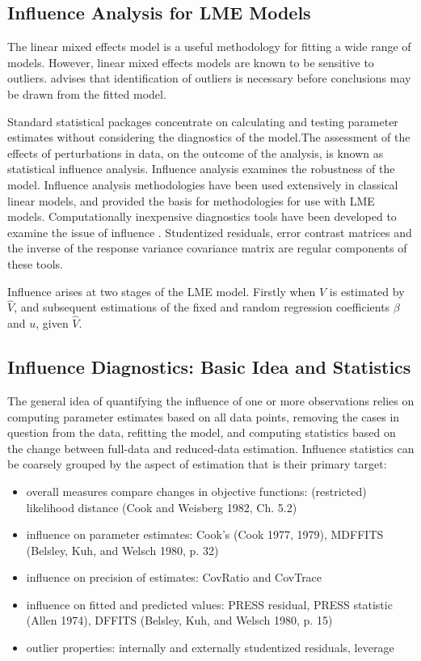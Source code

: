 \documentclass[12pt, a4paper]{article}
\begin{document}
	
	\subsection{Influence Analysis for LME Models} %
	The linear mixed effects model is a useful methodology for fitting a wide range of models. However, linear mixed effects models are known to be sensitive to outliers. \citet{CPJ} advises that identification of outliers is necessary before conclusions may be drawn from the fitted model.
	
	Standard statistical packages concentrate on calculating and testing parameter estimates without considering the diagnostics of the model.The assessment of the effects of perturbations in data, on the outcome of the analysis, is known as statistical influence analysis. Influence analysis examines the robustness of the model. Influence analysis methodologies have been used extensively in classical linear models, and provided the basis for methodologies for use with LME models.
	Computationally inexpensive diagnostics tools have been developed to examine the issue of influence \citep{Zewotir}.
	Studentized residuals, error contrast matrices and the inverse of the response variance covariance matrix are regular components of these tools.
	
	Influence arises at two stages of the LME model. Firstly when $V$ is estimated by $\hat{V}$, and subsequent
	estimations of the fixed and random regression coefficients $\beta$ and $u$, given $\hat{V}$.
	
\subsection{Influence Diagnostics: Basic Idea and Statistics}

The general idea of quantifying the influence of one or more observations relies on computing parameter estimates based on all data points, removing the cases in question from the data, refitting the model, and computing statistics based on the change between full-data and reduced-data estimation. Influence statistics can be coarsely grouped by the aspect of estimation that is their primary target:
\begin{itemize}
	\item overall measures compare changes in objective functions: (restricted) likelihood distance (Cook and Weisberg 1982, Ch. 5.2)
	\item influence on parameter estimates: Cook's  (Cook 1977, 1979), MDFFITS (Belsley, Kuh, and Welsch 1980, p. 32)
	\item influence on precision of estimates: CovRatio and CovTrace
	\item influence on fitted and predicted values: PRESS residual, PRESS statistic (Allen 1974), DFFITS (Belsley, Kuh, and Welsch 1980, p. 15)
	\item outlier properties: internally and externally studentized residuals, leverage
\end{itemize}
\end{document}
